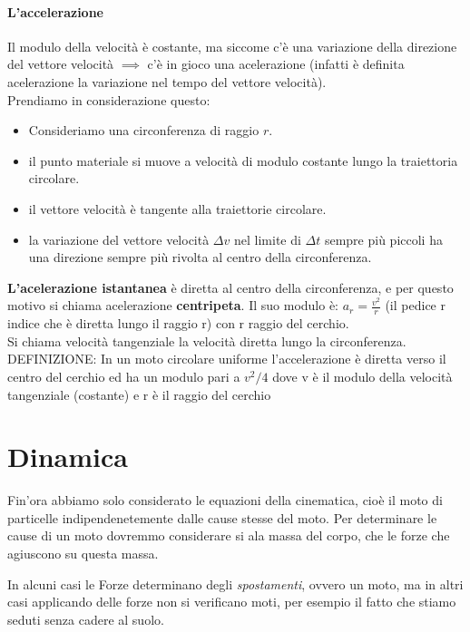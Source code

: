 \documentclass[12pt, a4paper, openany]{book}
\begin{document}
\paragraph*{L'accelerazione }Il modulo della velocità è costante, ma siccome c'è una variazione della direzione del vettore velocità $\implies$ c'è in gioco una acelerazione
(infatti è definita acelerazione la variazione nel tempo del vettore velocità).
\\Prendiamo in considerazione questo:
\begin{itemize}
    \item Consideriamo una circonferenza di raggio $r$.
    \item il punto materiale si muove a velocità di modulo costante lungo la traiettoria circolare.
    \item il vettore velocità è tangente alla traiettorie circolare.
    \item la variazione del vettore velocità $\Delta v$ nel limite di $\Delta t$ sempre più piccoli ha una direzione sempre più rivolta al centro della circonferenza.
\end{itemize}
\textbf{L'acelerazione istantanea} è diretta al centro della circonferenza, e per questo motivo si chiama acelerazione \textbf{centripeta}.
Il suo modulo è: $a_r = \frac{v^2}{r}$ (il pedice r indice che è diretta lungo il raggio r) con r raggio del cerchio.
\\Si chiama velocità tangenziale la velocità diretta lungo la circonferenza.
\\DEFINIZIONE: In un moto circolare uniforme l'accelerazione è diretta verso il centro del cerchio ed ha un modulo pari a $v^2/4$ dove v è il modulo della velocità tangenziale (costante) e r è il raggio del cerchio

\section{Dinamica}
Fin'ora abbiamo solo considerato le equazioni della cinematica, cioè il moto di particelle indipendenetemente dalle cause stesse del moto.
Per determinare le cause di un moto dovremmo considerare si ala massa del corpo, che le forze che agiuscono su questa massa.

In alcuni casi le Forze determinano degli \emph{spostamenti}, ovvero un moto, ma in altri casi applicando delle forze non si verificano moti, per esempio il fatto che stiamo seduti senza cadere al suolo.
\end{document}
